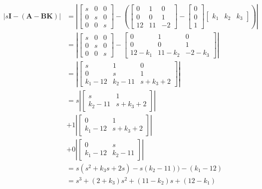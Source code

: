 \documentclass[main.tex]{subfiles}
\begin{document}
\begin{enumerate}
\begin{enumerate}
        $$
        \begin{aligned}
        |s \mathbf{I}-(\mathbf{A}-\mathbf{B K})| &= \left|\left[\begin{array}{ccc}
        s & 0 & 0 \\
        0 & s & 0 \\
        0 & 0 & s
        \end{array}\right] - \left(\left[\begin{array}{ccc}
        0 & 1 & 0 \\
        0 & 0 & 1 \\
        12 & 11 & -2
        \end{array}\right] - \left[\begin{array}{l}
        0 \\
        0 \\
        1
        \end{array}\right] \left[\begin{array}{lll}
        k_1 & k_2 & k_3
        \end{array}\right] \right) \right| \\
        & = \left|\left[\begin{array}{ccc}
        s & 0 & 0 \\
        0 & s & 0 \\
        0 & 0 & s
        \end{array}\right] - \left[\begin{array}{ccc}
        0 & 1 & 0 \\
        0 & 0 & 1 \\
        12 - k_1 & 11 - k_2 & -2 - k_3
        \end{array}\right] \right| \\
        & = \left| \left[\begin{array}{ccc}
        s & 1 & 0 \\
        0 & s & 1 \\
        k_1 - 12 & k_2 - 11 & s + k_3 + 2
        \end{array}\right]\right| \\
        & = s \left|\left[\begin{array}{cc}
        s & 1 \\
        k_2-11 & s+k_3+2
        \end{array}\right]\right| \\
        & + 1 \left|\left[\begin{array}{cc}
        0 & 1 \\
        k_1-12 & s+k_3+2
        \end{array}\right]\right| \\
        & + 0 \left|\left[\begin{array}{cc}
        0 & s \\
        k_1-12 & k_2-11
        \end{array}\right]\right| \\
        & = s(s^2 + k_3s + 2s) - s(k_2-11)) - (k_1-12) \\
        & = s^3 + (2+k_3)s^2 + (11-k_2)s + (12-k_1)
        \end{aligned}
        $$        
        

\end{enumerate}
\end{enumerate}
\end{document}
